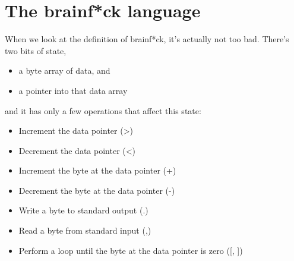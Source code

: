 \documentclass{article}
\begin{document}
\section{The brainf*ck language}
When we look at the definition of brainf*ck, it’s actually not too bad. There’s two bits of state,

\begin{itemize}
\item a byte array of data, and
\item a pointer into that data array
\end{itemize}

and it has only a few operations that affect this state:
\begin{itemize}
\item Increment the data pointer (>)

\item Decrement the data pointer (<)

\item Increment the byte at the data pointer (+)

\item Decrement the byte at the data pointer (-)

\item Write a byte to standard output (.)

\item Read a byte from standard input (,)

\item Perform a loop until the byte at the data pointer is zero ([, ])
\end{itemize}
\end{document}
